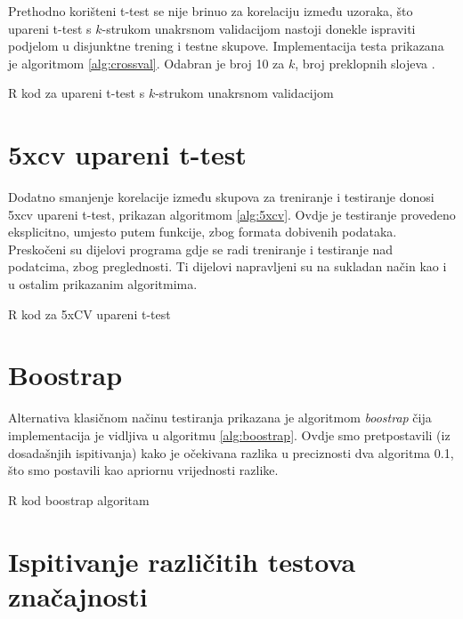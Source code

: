 Prethodno korišteni t-test se nije brinuo za korelaciju između uzoraka, što upareni t-test s $k$-strukom unakrsnom validacijom nastoji donekle ispraviti podjelom u disjunktne trening i testne skupove. Implementacija testa prikazana je algoritmom \ref{alg:crossval}. Odabran je broj 10 za $k$, broj preklopnih slojeva .

\begin{algorithm}

\caption{R kod za upareni t-test s $k$-strukom unakrsnom validacijom}
\label{alg:crossval}
\end{algorithm}

\section{5xcv upareni t-test}

Dodatno smanjenje korelacije između skupova za treniranje i testiranje donosi 5xcv upareni t-test, prikazan algoritmom \ref{alg:5xcv}. Ovdje je testiranje provedeno eksplicitno, umjesto putem funkcije, zbog formata dobivenih podataka. Preskočeni su dijelovi programa gdje se radi treniranje i testiranje nad podatcima, zbog preglednosti. Ti dijelovi napravljeni su na sukladan način kao i u ostalim prikazanim algoritmima.

\begin{algorithm}

\caption{R kod za 5xCV upareni t-test}
\label{alg:5xcv}
\end{algorithm}

\section{Boostrap}

Alternativa klasičnom načinu testiranja prikazana je algoritmom \textit{boostrap} čija implementacija je vidljiva u algoritmu \ref{alg:boostrap}. Ovdje smo pretpostavili (iz dosadašnjih ispitivanja) kako je očekivana razlika u preciznosti dva algoritma 0.1, što smo postavili kao apriornu vrijednosti razlike. 

\begin{algorithm}[h]

\caption{R kod boostrap algoritam}
\label{alg:boostrap}
\end{algorithm}

\section{Ispitivanje različitih testova značajnosti}


